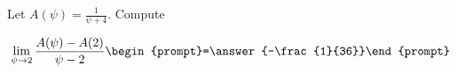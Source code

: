 \documentclass{ximera}
\author{Bart Snapp}
\begin{document}
\begin{exercise}
Let $A(\psi) = \frac{1}{\psi +4}$. Compute

\[
\lim_{ \psi\to 2 } 
\frac{A(\psi)-A(2)}{\psi -2} \begin{prompt}=\answer{-\frac{1}{36}}\end{prompt}
\]
\end{exercise}
\end{document}
